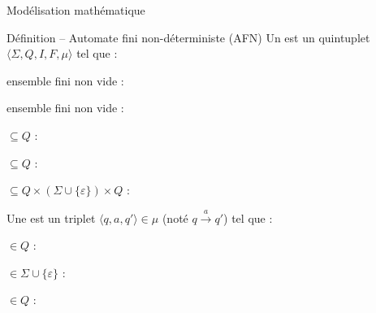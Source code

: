 
\begingroup

\begin{frame}{Modélisation mathématique}
  \begin{block}{Définition -- Automate fini non-déterministe (AFN)}
    \vspace{3mm}
    Un  est un quintuplet \alert{$\langle \Sigma, Q, I, F, \mu \rangle$} tel que :
    \begin{description}[xxxxx]
    \item[\alert{$\Sigma$}] ensemble fini non vide : 
    \item[\alert{$Q$}] ensemble fini non vide : 
    \item[\alert{$I$}] $\subseteq Q$ : 
    \item[\alert{$F$}] $\subseteq Q$ : 
    \item[\alert{$\mu$}] $\subseteq  Q \times (\Sigma \cup \{\varepsilon\}) \times Q$ : 
    \end{description}

    \vspace{3mm}
    Une  est un triplet \alert{$\langle q, a, q' \rangle \in \mu$} (noté \alert{$q\xrightarrow{a} q'$}) tel que :
    \begin{description}[xxxxx]
    \item[\alert{$q$}] $\in Q$ : 
    \item[\alert{$a$}] $\in \Sigma \cup \{\varepsilon\}$ : 
    \item[\alert{$q'$}] $\in Q$ : 
    \end{description}
  \end{block}

\end{frame}

\endgroup
